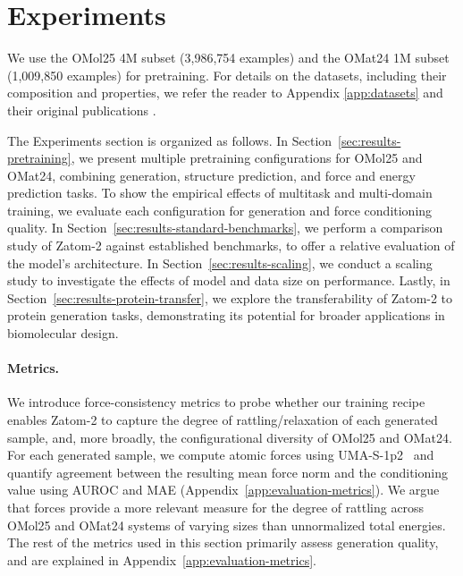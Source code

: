 \documentclass{article} %
\begin{document}
\section{Experiments}
\label{sec:experiments}

We use the OMol25 4M subset (3,986,754 examples) \citep{levine2025omol25} and the OMat24 1M subset (1,009,850 examples) \citep{barrosoluque2024omat24} for pretraining. For details on the datasets, including their composition and properties, we refer the reader to Appendix \ref{app:datasets} and their original publications \citep{levine2025omol25, barrosoluque2024omat24}.

The Experiments section is organized as follows. In Section~\ref{sec:results-pretraining}, we present multiple pretraining configurations for OMol25 and OMat24, combining generation, structure prediction, and force and energy prediction tasks. To show the empirical effects of multitask and multi-domain training, we evaluate each configuration for generation and force conditioning quality. In Section~\ref{sec:results-standard-benchmarks}, we perform a comparison study of Zatom-2 against established benchmarks, to offer a relative evaluation of the model's architecture. In Section~\ref{sec:results-scaling}, we conduct a scaling study to investigate the effects of model and data size on performance. Lastly, in Section~\ref{sec:results-protein-transfer}, we explore the transferability of Zatom-2 to protein generation tasks, demonstrating its potential for broader applications in biomolecular design.

\paragraph{Metrics.} We introduce force-consistency metrics to probe whether our training recipe enables Zatom-2 to capture the degree of rattling/relaxation of each generated sample, and, more broadly, the configurational diversity of OMol25 and OMat24. For each generated sample, we compute atomic forces using UMA-S-1p2~\citep{wood2025uma} and quantify agreement between the resulting mean force norm and the conditioning value using AUROC and MAE (Appendix~\ref{app:evaluation-metrics}). We argue that forces provide a more relevant measure for the degree of rattling across OMol25 and OMat24 systems of varying sizes than unnormalized total energies.  The rest of the metrics used in this section primarily assess generation quality, and are explained in Appendix~\ref{app:evaluation-metrics}.
\end{document}
